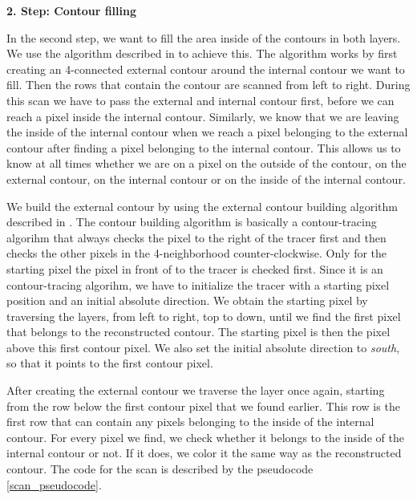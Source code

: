 \documentclass[thesis.tex]{subfiles}
\begin{document}
\textbf{2. Step: Contour filling}

In the second step, we want to fill the area inside of the contours in both layers. We use the algorithm described in \cite{inside_contour} to achieve this. The algorithm works by first creating an 4-connected external contour around the internal contour we want to fill. Then the rows that contain the contour are scanned from left to right. During this scan we have to pass the external and internal contour first, before we can reach a pixel inside the internal contour. Similarly, we know that we are leaving the inside of the internal contour when we reach a pixel belonging to the external contour after finding a pixel belonging to the internal contour. This allows us to know at all times whether we are on a pixel on the outside of the contour, on the external contour, on the internal contour or on the inside of the internal contour.

We build the external contour by using the external contour building algorithm described in \cite{inside_contour}. The contour building algorithm is basically a contour-tracing algorihm that always checks the pixel to the right of the tracer first and then checks the other pixels in the 4-neighborhood counter-clockwise. Only for the starting pixel the pixel in front of to the tracer is checked first. Since it is an contour-tracing algorihm, we have to initialize the tracer with a starting pixel position and an initial absolute direction. We obtain the starting pixel by traversing the layers, from left to right, top to down, until we find the first pixel that belongs to the reconstructed contour. The starting pixel is then the pixel above this first contour pixel. We also set the initial absolute direction to \textit{south}, so that it points to the first contour pixel.

After creating the external contour we traverse the layer once again, starting from the row below the first contour pixel that we found earlier. This row is the first row that can contain any pixels belonging to the inside of the internal contour. For every pixel we find, we check whether it belongs to the inside of the internal contour or not. If it does, we color it the same way as the reconstructed contour. The code for the scan is described by the pseudocode \ref{scan_pseudocode}.
\end{document}
